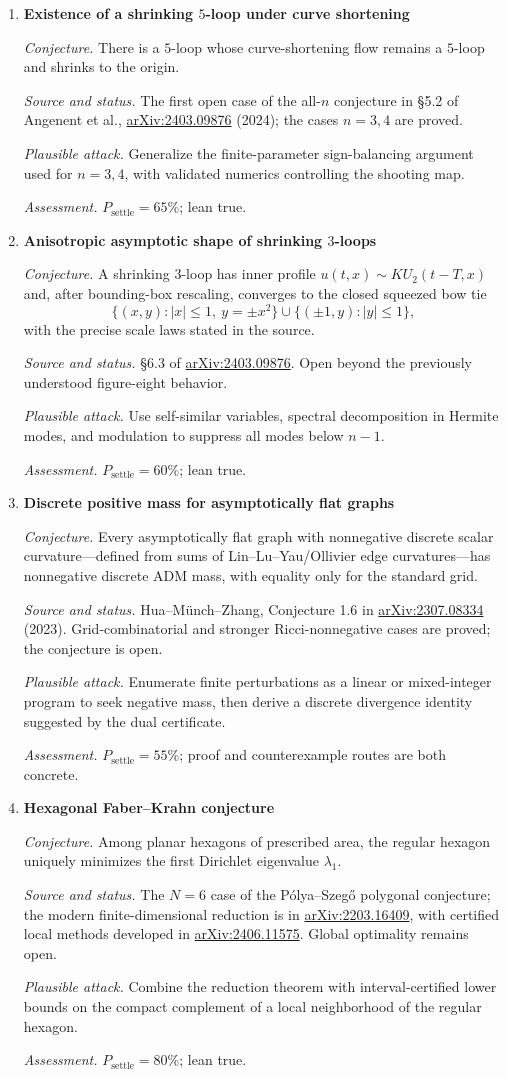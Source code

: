 \documentclass[11pt]{article}
\newcommand{\cand}[5]{%
  \item \textbf{#1}\par
  \emph{Conjecture.} #2\par
  \emph{Source and status.} #3\par
  \emph{Plausible attack.} #4\par
  \emph{Assessment.} #5
}
\newcommand{\psettle}{P_{\mathrm{settle}}}
\begin{document}
\begin{enumerate}[label=\textbf{M\arabic*.}]
\cand{Existence of a shrinking $5$-loop under curve shortening}
{There is a $5$-loop whose curve-shortening flow remains a $5$-loop and shrinks to the origin.}
{The first open case of the all-$n$ conjecture in \S5.2 of Angenent et al., \href{https://arxiv.org/abs/2403.09876}{arXiv:2403.09876} (2024); the cases $n=3,4$ are proved.}
{Generalize the finite-parameter sign-balancing argument used for $n=3,4$, with validated numerics controlling the shooting map.}
{$\psettle=65\%$; lean true.}

\cand{Anisotropic asymptotic shape of shrinking $3$-loops}
{A shrinking $3$-loop has inner profile $u(t,x)\sim K U_{2}(t-T,x)$ and, after bounding-box rescaling, converges to the closed squeezed bow tie
\[\{(x,y):|x|\le1,\ y=\pm x^{2}\}\cup\{(\pm1,y):|y|\le1\},\]
with the precise scale laws stated in the source.}
{\S6.3 of \href{https://arxiv.org/abs/2403.09876}{arXiv:2403.09876}.  Open beyond the previously understood figure-eight behavior.}
{Use self-similar variables, spectral decomposition in Hermite modes, and modulation to suppress all modes below $n-1$.}
{$\psettle=60\%$; lean true.}

\cand{Discrete positive mass for asymptotically flat graphs}
{Every asymptotically flat graph with nonnegative discrete scalar curvature---defined from sums of Lin--Lu--Yau/Ollivier edge curvatures---has nonnegative discrete ADM mass, with equality only for the standard grid.}
{Hua--M\"unch--Zhang, Conjecture 1.6 in \href{https://arxiv.org/abs/2307.08334}{arXiv:2307.08334} (2023).  Grid-combinatorial and stronger Ricci-nonnegative cases are proved; the conjecture is open.}
{Enumerate finite perturbations as a linear or mixed-integer program to seek negative mass, then derive a discrete divergence identity suggested by the dual certificate.}
{$\psettle=55\%$; proof and counterexample routes are both concrete.}

\cand{Hexagonal Faber--Krahn conjecture}
{Among planar hexagons of prescribed area, the regular hexagon uniquely minimizes the first Dirichlet eigenvalue $\lambda_1$.}
{The $N=6$ case of the P\'olya--Szeg\H{o} polygonal conjecture; the modern finite-dimensional reduction is in \href{https://arxiv.org/abs/2203.16409}{arXiv:2203.16409}, with certified local methods developed in \href{https://arxiv.org/abs/2406.11575}{arXiv:2406.11575}.  Global optimality remains open.}
{Combine the reduction theorem with interval-certified lower bounds on the compact complement of a local neighborhood of the regular hexagon.}
{$\psettle=80\%$; lean true.}


\end{enumerate}
\end{document}
